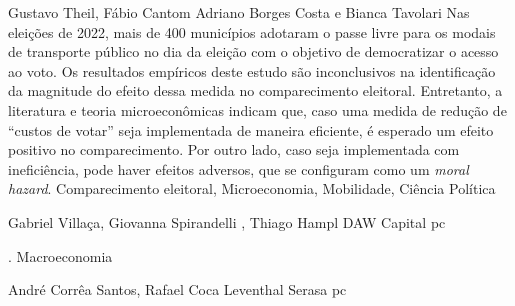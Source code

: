 \documentclass[
    10pt, 
    a4paper, 
    draft
    ]{article}
\begin{document}
\tableofcontents

    {Gustavo Theil, Fábio Cantom}
    {Adriano Borges Costa e Bianca Tavolari}
    {
        Nas eleições de 2022, mais de 400 municípios adotaram o passe livre para os modais de transporte público no dia da eleição com o objetivo de democratizar o acesso ao voto. Os resultados empíricos deste estudo são inconclusivos na identificação da magnitude do efeito dessa medida no comparecimento eleitoral. Entretanto, a literatura e teoria microeconômicas indicam que, caso uma medida de redução de ``custos de votar'' seja implementada de maneira eficiente, é esperado um efeito positivo no comparecimento. Por outro lado, caso seja implementada com ineficiência, pode haver efeitos adversos, que se configuram como um \textit{moral hazard}.
    }
    {Comparecimento eleitoral, Microeconomia, Mobilidade, Ciência Política}




    {Gabriel Villaça, Giovanna Spirandelli , Thiago Hampl}
    {DAW Capital}
    {\lipsum[1-1]}
    {pc}



    {.}
    {}
    {\lipsum[1-1]}
    {Macroeconomia}




    {André Corrêa Santos, Rafael Coca Leventhal}
    {Serasa}
    {\lipsum[1-1]}
    {pc}





\printbibliography

\appendix
\end{document}
